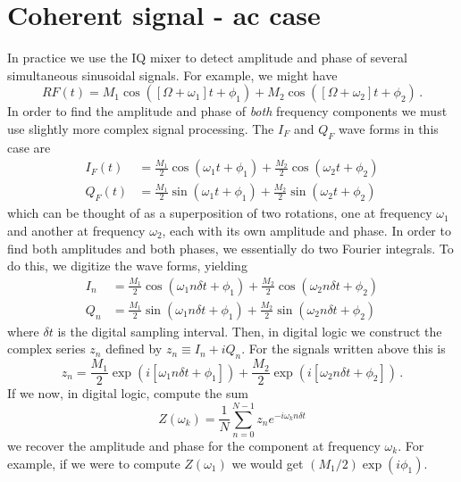 \section{Coherent signal - ac case}

In practice we use the IQ mixer to detect amplitude and phase of several simultaneous sinusoidal signals.
For example, we might have
\begin{equation}
RF(t) = M_1 \cos([\Omega + \omega_1] t + \phi_1 ) + M_2 \cos([\Omega + \omega_2] t + \phi_2) \, .
\end{equation}
In order to find the amplitude and phase of \emph{both} frequency components we must use slightly more complex signal processing.
The $I_F$ and $Q_F$ wave forms in this case are
\begin{align}
I_F(t) &= \frac{M_1}{2} \cos(\omega_1 t + \phi_1) + \frac{M_2}{2} \cos(\omega_2 t + \phi_2) \\
Q_F(t) &= \frac{M_1}{2} \sin(\omega_1 t + \phi_1) + \frac{M_2}{2} \sin(\omega_2 t + \phi_2)
\end{align}
which can be thought of as a superposition of two rotations, one at frequency $\omega_1$ and another at frequency $\omega_2$, each with its own amplitude and phase.
In order to find both amplitudes and both phases, we essentially do two Fourier integrals.
To do this, we digitize the wave forms, yielding
\begin{align}
I_n &= \frac{M_1}{2} \cos(\omega_1 n \delta t + \phi_1) + \frac{M_2}{2} \cos(\omega_2 n \delta t + \phi_2) \\
Q_n &= \frac{M_1}{2} \sin(\omega_1 n \delta t + \phi_1) + \frac{M_2}{2} \sin(\omega_2 n \delta t + \phi_2)
\end{align}
where $\delta t$ is the digital sampling interval.
Then, in digital logic we construct the complex series $z_n$ defined by $z_n \equiv I_n + i Q_n$.
For the signals written above this is
\begin{equation}
z_n =
\frac{M_1}{2} \exp \left( i \left[ \omega_1 n \delta t + \phi_1 \right] \right)
+ \frac{M_2}{2} \exp \left( i \left[ \omega_2 n \delta t + \phi_2 \right] \right) \, .
\end{equation}
If we now, in digital logic, compute the sum
\begin{equation}
Z(\omega_k) = \frac{1}{N}\sum_{n=0}^{N-1} z_n e^{-i \omega_k n \delta t}
\end{equation}
we recover the amplitude and phase for the component at frequency $\omega_k$.
For example, if we were to compute $Z(\omega_1)$ we would get $(M_1/2) \exp(i \phi_1)$.


